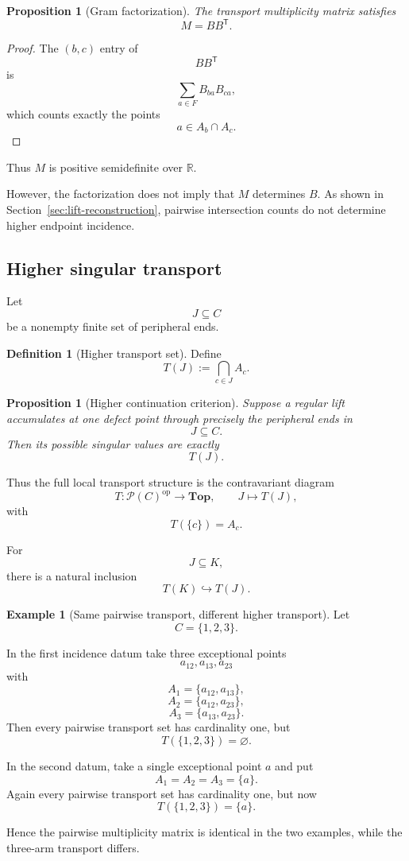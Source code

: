 \documentclass[11pt]{article}
\theoremstyle{plain}
\newtheorem{proposition}[theorem]{Proposition}
\theoremstyle{definition}
\newtheorem{definition}[theorem]{Definition}
\newtheorem{example}[theorem]{Example}
\begin{document}
\begin{proposition}[Gram factorization]
\label{prop:transport-Gram}
The transport multiplicity matrix satisfies
\[
M=BB^{\mathsf T}.
\]
\end{proposition}

\begin{proof}
The $(b,c)$ entry of
\[
BB^{\mathsf T}
\]
is
\[
\sum_{a\in F}B_{ba}B_{ca},
\]
which counts exactly the points
\[
a\in A_b\cap A_c.
\]
\end{proof}

Thus $M$ is positive semidefinite over $\mathbb R$.

However, the factorization does not imply that $M$ determines $B$.
As shown in Section~\ref{sec:lift-reconstruction}, pairwise intersection
counts do not determine higher endpoint incidence.

\subsection{Higher singular transport}
\label{subsec:higher-singular-transport}

Let
\[
J\subseteq C
\]
be a nonempty finite set of peripheral ends.

\begin{definition}[Higher transport set]
\label{def:higher-transport-set}
Define
\[
T(J)
:=
\bigcap_{c\in J}A_c.
\]
\end{definition}

\begin{proposition}[Higher continuation criterion]
\label{prop:higher-continuation}
Suppose a regular lift accumulates at one defect point through precisely
the peripheral ends in
\[
J\subseteq C.
\]
Then its possible singular values are exactly
\[
T(J).
\]
\end{proposition}

Thus the full local transport structure is the contravariant diagram
\[
T:
\mathcal P(C)^{\mathrm{op}}
\longrightarrow
\mathbf{Top},
\qquad
J\longmapsto T(J),
\]
with
\[
T(\{c\})=A_c.
\]

For
\[
J\subseteq K,
\]
there is a natural inclusion
\[
T(K)\hookrightarrow T(J).
\]


\begin{example}[Same pairwise transport, different higher transport]
\label{ex:same-pairwise-different-higher}
Let
\[
C=\{1,2,3\}.
\]

In the first incidence datum take three exceptional points
\[
a_{12},a_{13},a_{23}
\]
with
\[
A_1=\{a_{12},a_{13}\},
\]
\[
A_2=\{a_{12},a_{23}\},
\]
\[
A_3=\{a_{13},a_{23}\}.
\]
Then every pairwise transport set has cardinality one, but
\[
T(\{1,2,3\})=\varnothing.
\]

In the second datum, take a single exceptional point $a$ and put
\[
A_1=A_2=A_3=\{a\}.
\]
Again every pairwise transport set has cardinality one, but now
\[
T(\{1,2,3\})=\{a\}.
\]

Hence the pairwise multiplicity matrix is identical in the two examples,
while the three-arm transport differs.
\end{example}
\end{document}
